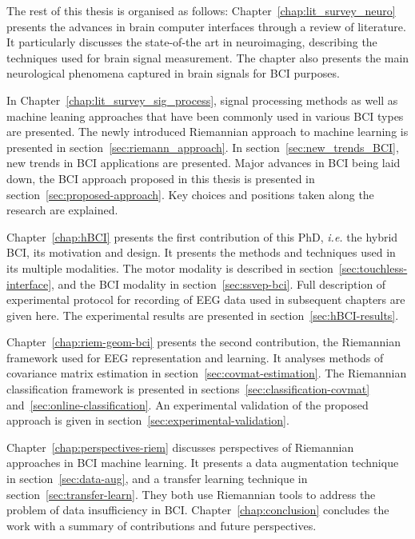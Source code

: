 The rest of this thesis is organised as follows:
Chapter~\ref{chap:lit_survey_neuro} presents the advances in brain computer interfaces through a review of literature.
It particularly discusses the state-of-the art in neuroimaging, describing the techniques used for brain signal measurement. 
The chapter also presents the main neurological phenomena captured in brain signals for BCI purposes.

In Chapter~\ref{chap:lit_survey_sig_process}, signal processing methods as well as machine leaning approaches that have been commonly  used in various BCI types are presented. 
The newly introduced Riemannian  approach to machine learning is presented in section~\ref{sec:riemann_approach}. 
In section~\ref{sec:new_trends_BCI}, new trends in BCI applications are presented. 
Major advances in BCI being laid down, the BCI approach proposed in this thesis is presented in section~\ref{sec:proposed-approach}. Key choices and positions taken along the research are explained.


Chapter~\ref{chap:hBCI} presents the first contribution of this PhD, \textit{i.e.} the hybrid BCI, its motivation and design. 
It presents the methods and techniques used in its multiple modalities. 
The motor modality is described in section~\ref{sec:touchless-interface}, and the BCI modality in section~\ref{sec:ssvep-bci}. 
Full description of experimental protocol for recording of EEG data used in subsequent chapters are given here. 
The experimental results are presented in section~\ref{sec:hBCI-results}.

Chapter~\ref{chap:riem-geom-bci} presents the second contribution, the Riemannian framework used for EEG representation and learning.
It analyses methods of covariance matrix estimation in section~\ref{sec:covmat-estimation}.
The Riemannian classification framework is presented in sections~\ref{sec:classification-covmat} and~\ref{sec:online-classification}.
An experimental validation of the proposed approach is given in section~\ref{sec:experimental-validation}.

Chapter~\ref{chap:perspectives-riem} discusses perspectives of Riemannian approaches in BCI machine learning.
It presents a data augmentation technique in section~\ref{sec:data-aug}, and a transfer learning technique in section~\ref{sec:transfer-learn}. 
They both use Riemannian tools to address the problem of data insufficiency in BCI.
Chapter~\ref{chap:conclusion} concludes the work with a summary of contributions and future perspectives.
